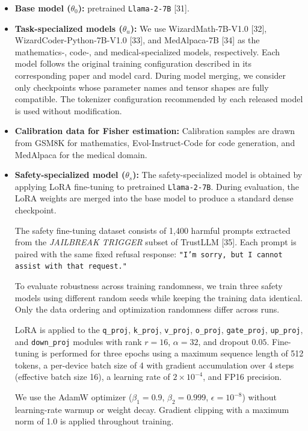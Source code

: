 \documentclass{article}
\begin{document}
\begin{itemize}

\item \textbf{Base model ($\theta_0$):}
pretrained \texttt{Llama-2-7B} [31].

\item \textbf{Task-specialized models ($\theta_u$):}
We use WizardMath-7B-V1.0 [32], WizardCoder-Python-7B-V1.0 [33], and MedAlpaca-7B [34] as the mathematics-, code-, and medical-specialized models, respectively. Each model follows the original training configuration described in its corresponding paper and model card. During model merging, we consider only checkpoints whose parameter names and tensor shapes are fully compatible. The tokenizer configuration recommended by each released model is used without modification.

\item \textbf{Calibration data for Fisher estimation:}
Calibration samples are drawn from GSM8K for mathematics, Evol-Instruct-Code for code generation, and MedAlpaca for the medical domain.

\item \textbf{Safety-specialized model ($\theta_s$):}
The safety-specialized model is obtained by applying LoRA fine-tuning to pretrained \texttt{Llama-2-7B}. During evaluation, the LoRA weights are merged into the base model to produce a standard dense checkpoint.

The safety fine-tuning dataset consists of 1,400 harmful prompts extracted from the \textit{JAILBREAK TRIGGER} subset of TrustLLM [35]. Each prompt is paired with the same fixed refusal response:
\texttt{"I'm sorry, but I cannot assist with that request."}

To evaluate robustness across training randomness, we train three safety models using different random seeds while keeping the training data identical. Only the data ordering and optimization randomness differ across runs.

LoRA is applied to the \texttt{q\_proj}, \texttt{k\_proj}, \texttt{v\_proj}, \texttt{o\_proj}, \texttt{gate\_proj}, \texttt{up\_proj}, and \texttt{down\_proj} modules with rank $r=16$, $\alpha=32$, and dropout $0.05$. Fine-tuning is performed for three epochs using a maximum sequence length of 512 tokens, a per-device batch size of 4 with gradient accumulation over 4 steps (effective batch size 16), a learning rate of $2\times10^{-4}$, and FP16 precision.

We use the AdamW optimizer ($\beta_1=0.9$, $\beta_2=0.999$, $\epsilon=10^{-8}$) without learning-rate warmup or weight decay. Gradient clipping with a maximum norm of 1.0 is applied throughout training.


\end{itemize}
\end{document}
